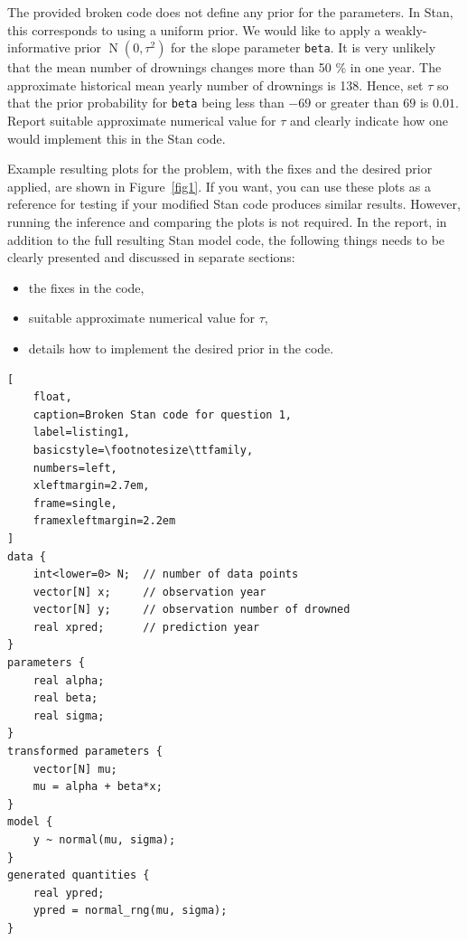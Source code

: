 \documentclass[a4paper,11pt]{article}
\begin{document}
The provided broken code does not define any prior for the parameters. In Stan, this corresponds to using a uniform prior. We would like to apply a weakly-informative prior $\operatorname{N}(0, \tau^2)$ for the slope parameter {\tt beta}. It is very unlikely that the mean number of drownings changes more than 50 \% in one year. The approximate historical mean yearly number of drownings is 138. Hence, set $\tau$ so that the prior probability for {\tt beta} being less than $-69$ or greater than $69$ is $0.01$. Report suitable approximate numerical value for $\tau$ and clearly indicate how one would implement this in the Stan code.

Example resulting plots for the problem, with the fixes and the desired prior applied, are shown in Figure~\ref{fig1}. If you want, you can use these plots as a reference for testing if your modified Stan code produces similar results. However, running the inference and comparing the plots is not required. In the report, in addition to the full resulting Stan model code, the following things needs to be clearly presented and discussed in separate sections:
\begin{itemize}
\item the fixes in the code,
\item suitable approximate numerical value for $\tau$,
\item details how to implement the desired prior in the code.
\end{itemize}

\begin{lstlisting}[
	float,
	caption=Broken Stan code for question 1,
	label=listing1,
	basicstyle=\footnotesize\ttfamily,
	numbers=left,
	xleftmargin=2.7em,
	frame=single,
	framexleftmargin=2.2em
]
data {
    int<lower=0> N;  // number of data points
    vector[N] x;     // observation year
    vector[N] y;     // observation number of drowned
    real xpred;      // prediction year
}
parameters {
    real alpha;
    real beta;
    real sigma;
}
transformed parameters {
    vector[N] mu;
    mu = alpha + beta*x;
}
model {
    y ~ normal(mu, sigma);
}
generated quantities {
    real ypred;
    ypred = normal_rng(mu, sigma);
}
\end{lstlisting}
\end{document}
